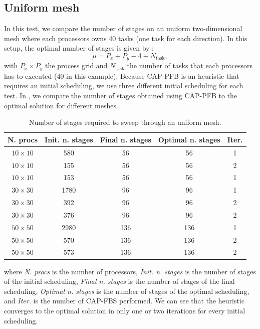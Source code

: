 \documentclass[letterpaper]{article}
\renewcommand{\(}{\left(}
\renewcommand{\)}{\right)}
\renewcommand{\[}{\left[}
\renewcommand{\]}{\right]}
\begin{document}
\subsection{Uniform mesh}
In this test, we compare the number of stages on an uniform two-dimensional mesh 
where each processors owns 40 tasks (one task for each direction). In this
setup, the optimal number of stages is given by \cite{Adams2013}:
\begin{equation}
  \mu = P_x + P_y - 4 + N_{\textrm{task}},
\end{equation}
with $P_x \times P_y$ the process grid and $N_{\textrm{task}}$ the number of
tasks that each processors has to executed (40 in this example). Because CAP-PFB
is an heuristic that requires an initial scheduling, we use three different
initial scheduling for each test. In , we compare the number of
stages obtained using CAP-PFB to the optimal solution for different meshes.
\begin{table}[H]
  \begin{center}
    \begin{tabular}{|c|c|c|c|c|}
      \hline
      N. procs & Init. n. stages & Final n. stages & Optimal n. stages & Iter. \\
      \hline
      $10\times 10$ &  580 &  56 &  56 & 1 \\
      $10\times 10$ &  155 &  56 &  56 & 2 \\
      $10\times 10$ &  153 &  56 &  56 & 1 \\
      $30\times 30$ & 1780 &  96 &  96 & 1 \\
      $30\times 30$ &  392 &  96 &  96 & 2 \\
      $30\times 30$ &  376 &  96 &  96 & 2 \\
      $50\times 50$ & 2980 & 136 & 136 & 1 \\
      $50\times 50$ &  570 & 136 & 136 & 2 \\ 
      $50\times 50$ &  573 & 136 & 136 & 2 \\
      \hline
    \end{tabular}
    \caption{Number of stages required to sweep through an uniform mesh.}
    \label{uniform}
  \end{center}
\end{table}
where \emph{N. procs} is the number of processors, \emph{Init. n. stages} is the 
number of stages of the initial scheduling, \emph{Final n. stages} is the number 
of stages of the final scheduling, \emph{Optimal n. stages} is the number of 
stages of the optimal scheduling, and \emph{Iter.} is the number of CAP-FBS 
performed. We can see that the heuristic converges to the optimal solution in 
only one or two iterations for every initial scheduling.
\end{document}
